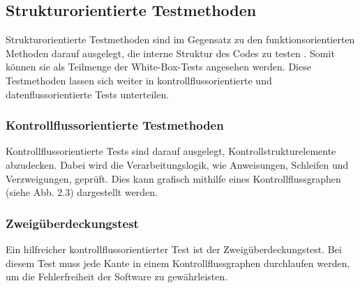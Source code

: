 \documentclass[	%
		fontsize=11pt,  %
		a4paper,	    %
		ngerman,		%
		sans,			%
		f4,				%
	]{HsH-report}		%
\begin{document}
\subsection{Strukturorientierte Testmethoden}
Strukturorientierte Testmethoden sind im Gegensatz zu den funktionsorientierten
Methoden darauf ausgelegt, die interne Struktur des Codes zu testen
\cite{liggesmeyer:qualitaet}. Somit können sie als Teilmenge der
White-Box-Tests angesehen werden. Diese Testmethoden lassen sich weiter in
kontrollflussorientierte und datenflussorientierte Tests unterteilen.

\subsubsection{Kontrollflussorientierte Testmethoden}

Kontrollflussorientierte Tests sind darauf ausgelegt, Kontrollstrukturelemente
abzudecken. Dabei wird die Verarbeitungslogik, wie Anweisungen, Schleifen und
Verzweigungen, geprüft. Dies kann grafisch mithilfe eines Kontrollflussgraphen
(siehe Abb. 2.3) dargestellt werden. \cite{liggesmeyer:qualitaet}

\subsubsection{Zweigüberdeckungstest}
Ein hilfreicher kontrollflussorientierter Test ist der Zweigüberdeckungstest.
Bei diesem Test muss jede Kante in einem Kontrollflussgraphen durchlaufen
werden, um die Fehlerfreiheit der Software zu gewährleisten.
\cite{liggesmeyer:qualitaet}
\end{document}
